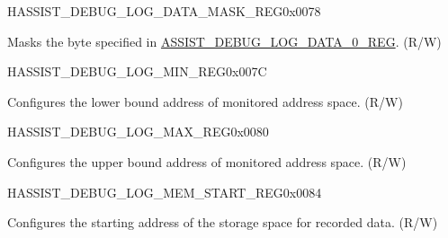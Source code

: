 \begin{register}{H}{ASSIST\_DEBUG\_LOG\_DATA\_MASK\_REG}{0x0078}\label{regdesc:ASSISTDEBUGLOGDATAMASKREG}
%
%
\regnewline%
\begin{regdesc}\begin{reglist}
\label{fielddesc:ASSISTDEBUGLOGDATASIZE}\item [ASSIST\_DEBUG\_LOG\_DATA\_SIZE] Masks the byte specified in \hyperref[regdesc:ASSISTDEBUGLOGDATA0REG]{ASSIST\_DEBUG\_LOG\_DATA\_0\_REG}. (R/W)
\end{reglist}\end{regdesc}
\end{register}


\begin{register}{H}{ASSIST\_DEBUG\_LOG\_MIN\_REG}{0x007C}\label{regdesc:ASSISTDEBUGLOGMINREG}
%
\regnewline%
\begin{regdesc}\begin{reglist}
\label{fielddesc:ASSISTDEBUGLOGMIN}\item [ASSIST\_DEBUG\_LOG\_MIN] Configures the lower bound address of monitored address space. (R/W)
\end{reglist}\end{regdesc}
\end{register}


\begin{register}{H}{ASSIST\_DEBUG\_LOG\_MAX\_REG}{0x0080}\label{regdesc:ASSISTDEBUGLOGMAXREG}
%
\regnewline%
\begin{regdesc}\begin{reglist}
\label{fielddesc:ASSISTDEBUGLOGMAX}\item [ASSIST\_DEBUG\_LOG\_MAX] Configures the upper bound address of monitored address space. (R/W)
\end{reglist}\end{regdesc}
\end{register}


\begin{register}{H}{ASSIST\_DEBUG\_LOG\_MEM\_START\_REG}{0x0084}\label{regdesc:ASSISTDEBUGLOGMEMSTARTREG}
%
\regnewline%
\begin{regdesc}\begin{reglist}
\label{fielddesc:ASSISTDEBUGLOGMEMSTART}\item [ASSIST\_DEBUG\_LOG\_MEM\_START] Configures the starting address of the storage space for recorded data. (R/W)
\end{reglist}\end{regdesc}
\end{register}


